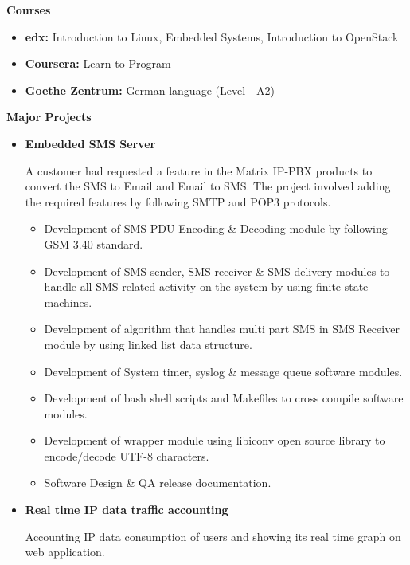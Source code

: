 \documentclass[letterpaper,10pt]{article}
\newcommand{\resitem}[1]{\item #1 \vspace{-2pt}}
\newcommand{\resheading}[1]{{\large \colorbox{mygrey}{\begin{minipage}{\textwidth}{\textbf{#1 \vphantom{p\^{E}}}}\end{minipage}}}}
\begin{document}
\resheading{Courses}
\begin{itemize}
\item \textbf{edx:} Introduction to Linux, Embedded Systems, Introduction to OpenStack
\item \textbf{Coursera:} Learn to Program
\item \textbf{Goethe Zentrum:} German language (Level - A2)
\end{itemize}
\resheading{Major Projects}
\begin{itemize}

\item
    \textbf{Embedded SMS Server}
    
    A customer had requested a feature in the Matrix IP-PBX products to convert the SMS to Email and Email to SMS. The project involved adding the required features by following SMTP and POP3 protocols.

	\begin{itemize}
		\resitem{Development of SMS PDU Encoding \& Decoding module by following GSM 3.40 standard.}
		
		\resitem{Development of SMS sender, SMS receiver \& SMS delivery modules to handle all SMS related activity on the system by using finite state machines.}
	    
	    \resitem{Development of algorithm that handles multi part SMS in SMS Receiver module by using linked list data structure.}
	    
	    \resitem{Development of System timer, syslog \& message queue software modules.}
	    
	    \resitem{Development of bash shell scripts and Makefiles to cross compile software modules.}
        
        \resitem{Development of wrapper module using libiconv open source library to encode/decode UTF-8 characters.}
        
        \resitem{Software Design \& QA release documentation.}
		
	\end{itemize}
	
\item
    \textbf{Real time IP data traffic accounting}
    
    Accounting IP data consumption of users and showing its real time graph on web application.
    

\end{itemize}
\end{document}
